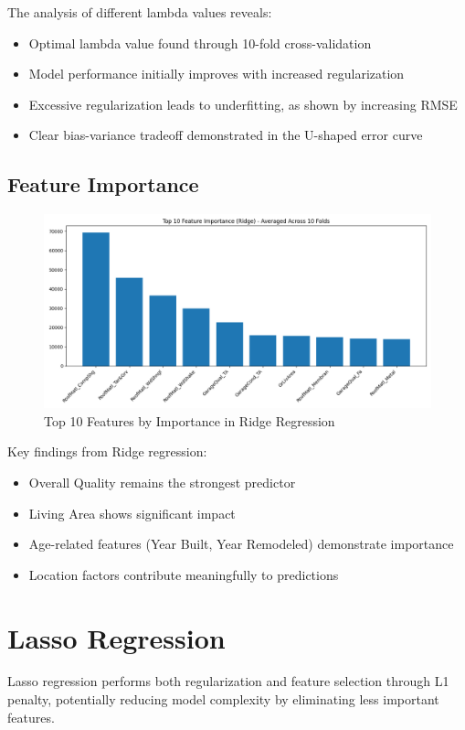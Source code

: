 The analysis of different lambda values reveals:
\begin{itemize}
    \item Optimal lambda value found through 10-fold cross-validation
    \item Model performance initially improves with increased regularization
    \item Excessive regularization leads to underfitting, as shown by increasing RMSE
    \item Clear bias-variance tradeoff demonstrated in the U-shaped error curve
\end{itemize}

\subsection{Feature Importance}
\begin{figure}[H]
    \centering
    \includegraphics[width=1.0\textwidth]{figures/ridge_feature_importance.png}
    \caption{Top 10 Features by Importance in Ridge Regression}
    \label{fig:ridge_importance}
\end{figure}

Key findings from Ridge regression:
\begin{itemize}
    \item Overall Quality remains the strongest predictor
    \item Living Area shows significant impact
    \item Age-related features (Year Built, Year Remodeled) demonstrate importance
    \item Location factors contribute meaningfully to predictions
\end{itemize}

\section{Lasso Regression}
Lasso regression performs both regularization and feature selection through L1 penalty, potentially reducing model complexity by eliminating less important features.

